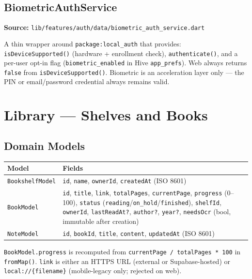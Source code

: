 \documentclass[11pt,a4paper]{article}
\begin{document}
\subsection{BiometricAuthService}

\textbf{Source:} \texttt{lib/features/auth/data/biometric\_auth\_service.dart}

A thin wrapper around \texttt{package:local\_auth} that provides:
\texttt{isDeviceSupported()} (hardware + enrollment check),
\texttt{authenticate()}, and a per-user opt-in flag
(\texttt{biometric\_enabled} in Hive \texttt{app\_prefs}). Web always returns
\texttt{false} from \texttt{isDeviceSupported()}. Biometric is an acceleration layer
only --- the PIN or email/password credential always remains valid.

\section{Library --- Shelves and Books}

\subsection{Domain Models}

\vspace{4pt}
\begin{tabularx}{\textwidth}{@{}L{3.2cm} L{10.4cm}@{}}
  \toprule
  \textbf{Model} & \textbf{Fields} \\
  \midrule
  \texttt{BookshelfModel} &
    \texttt{id}, \texttt{name}, \texttt{ownerId}, \texttt{createdAt} (ISO 8601) \\
  \texttt{BookModel} &
    \texttt{id}, \texttt{title}, \texttt{link}, \texttt{totalPages},
    \texttt{currentPage}, \texttt{progress} (0--100), \texttt{status}
    (\texttt{reading}/\texttt{on\_hold}/\texttt{finished}), \texttt{shelfId},
    \texttt{ownerId}, \texttt{lastReadAt?}, \texttt{author?}, \texttt{year?},
    \texttt{needsOcr} (bool, immutable after creation) \\
  \texttt{NoteModel} &
    \texttt{id}, \texttt{bookId}, \texttt{title}, \texttt{content},
    \texttt{updatedAt} (ISO 8601) \\
  \bottomrule
\end{tabularx}
\vspace{2pt}

\texttt{BookModel.progress} is recomputed from
\texttt{currentPage / totalPages * 100} in \texttt{fromMap()}.
\texttt{link} is either an HTTPS URL (external or Supabase-hosted) or
\texttt{local://\{filename\}} (mobile-legacy only; rejected on web).
\end{document}
